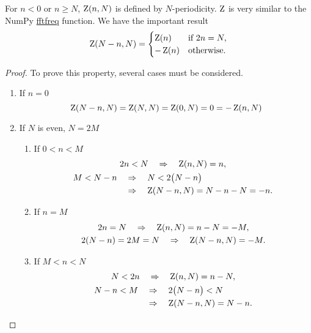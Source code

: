 For \(n<0\) or \(n\geq N\), \(\operatorname{Z}(n, N)\) is defined by
\(N\)-periodicity. \(\operatorname{Z}\) is very similar to the NumPy
\href{https://numpy.org/doc/1.18/reference/generated/numpy.fft.fftfreq.html#numpy.fft.fftfreq}{fftfreq}
function. We have the important result
\begin{equation}
  \operatorname{Z}(N-n, N)=
  \begin{cases}
    \operatorname{Z}(n) & \text{if }2n=N,\\
    -\operatorname{Z}(n) & \text{otherwise.}
  \end{cases}
\end{equation}
\begin{proof}
  To prove this property, several cases must be considered.
  \begin{enumerate}
  \item If \(n=0\)
    \begin{equation}
      \operatorname{Z}(N-n, N)=\operatorname{Z}(N, N)=\operatorname{Z}(0, N)=0=-\operatorname{Z}(n, N)
    \end{equation}
  \item If \(N\) is even, \(N=2M\)
    \begin{enumerate}
    \item If \(0<n<M\)
      \begin{gather*}
        2n<N\quad\Rightarrow\quad \operatorname{Z}(n, N)=n,\\
        \begin{aligned}
          M<N-n&\quad\Rightarrow\quad N<2\bigl(N-n\bigr)\\
          &\quad\Rightarrow\quad \operatorname{Z}(N-n, N)=N-n-N=-n.
        \end{aligned}
      \end{gather*}
    \item If \(n=M\)
      \begin{gather*}
        2n=N\quad\Rightarrow\quad \operatorname{Z}(n, N)=n-N=-M,\\
        2(N-n)=2M=N\quad\Rightarrow\quad \operatorname{Z}(N-n, N)=-M.
      \end{gather*}
    \item If \(M<n<N\)
      \begin{gather*}
        N<2n\quad\Rightarrow\quad \operatorname{Z}(n, N)=n-N,\\
        \begin{aligned}
          N-n<M&\quad\Rightarrow\quad 2\bigl(N-n\bigr)<N\\
          &\quad\Rightarrow\quad \operatorname{Z}(N-n, N)=N-n.
        \end{aligned}
      \end{gather*}

\end{enumerate}
\end{enumerate}
\end{proof}
